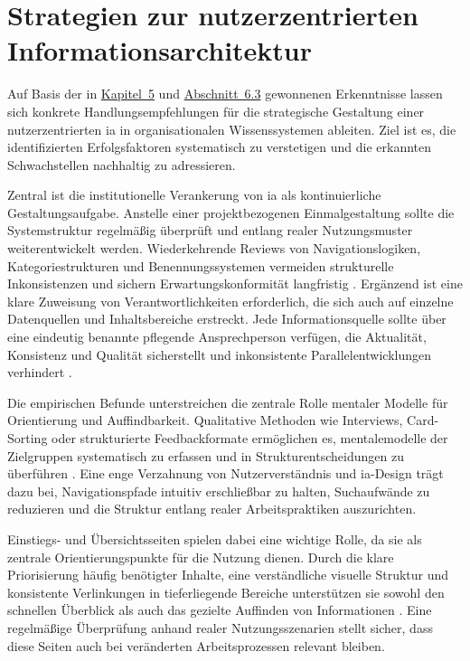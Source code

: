 \section{Strategien zur nutzerzentrierten Informationsarchitektur}
\label{sec:07-01_ia-strategy-recommendations}

Auf Basis der in \hyperref[ch:05_analysis-and-results]{Kapitel~5} und \hyperref[sec:06-03_organizational-ux-implications]{Abschnitt~6.3} gewonnenen Erkenntnisse lassen sich konkrete Handlungsempfehlungen für die strategische Gestaltung einer nutzerzentrierten \Gls{ia} in organisationalen Wissenssystemen ableiten. Ziel ist es, die identifizierten Erfolgsfaktoren systematisch zu verstetigen und die erkannten Schwachstellen nachhaltig zu adressieren.

Zentral ist die institutionelle Verankerung von \Gls{ia} als kontinuierliche Gestaltungsaufgabe. Anstelle einer projektbezogenen Einmalgestaltung sollte die Systemstruktur regelmäßig überprüft und entlang realer Nutzungsmuster weiterentwickelt werden. Wiederkehrende Reviews von Navigationslogiken, Kategoriestrukturen und Benennungssystemen vermeiden strukturelle Inkonsistenzen und sichern Erwartungskonformität langfristig \cite{303:Rosenfeld2015,108:ArangoFirstPrinciples2024}. Ergänzend ist eine klare Zuweisung von Verantwortlichkeiten erforderlich, die sich auch auf einzelne Datenquellen und Inhaltsbereiche erstreckt. Jede Informationsquelle sollte über eine eindeutig benannte pflegende Ansprechperson verfügen, die Aktualität, Konsistenz und Qualität sicherstellt und inkonsistente Parallelentwicklungen verhindert \cite{309:NNGContentGovernance}.

Die empirischen Befunde unterstreichen die zentrale Rolle mentaler Modelle für Orientierung und Auffindbarkeit. Qualitative Methoden wie Interviews, Card-Sorting oder strukturierte Feedbackformate ermöglichen es, \gls{mentalemodelle} der Zielgruppen systematisch zu erfassen und in Strukturentscheidungen zu überführen \cite{905:Norman1983,303:Rosenfeld2015}. Eine enge Verzahnung von Nutzerverständnis und \Gls{ia}-Design trägt dazu bei, Navigationspfade intuitiv erschließbar zu halten, Suchaufwände zu reduzieren und die Struktur entlang realer Arbeitspraktiken auszurichten.

Einstiegs- und Übersichtsseiten spielen dabei eine wichtige Rolle, da sie als zentrale Orientierungspunkte für die Nutzung dienen. Durch die klare Priorisierung häufig benötigter Inhalte, eine verständliche visuelle Struktur und konsistente Verlinkungen in tieferliegende Bereiche unterstützen sie sowohl den schnellen Überblick als auch das gezielte Auffinden von Informationen \cite{113:NNGIntranetGuidelines,307:DWGFindability}. Eine regelmäßige Überprüfung anhand realer Nutzungsszenarien stellt sicher, dass diese Seiten auch bei veränderten Arbeitsprozessen relevant bleiben.

